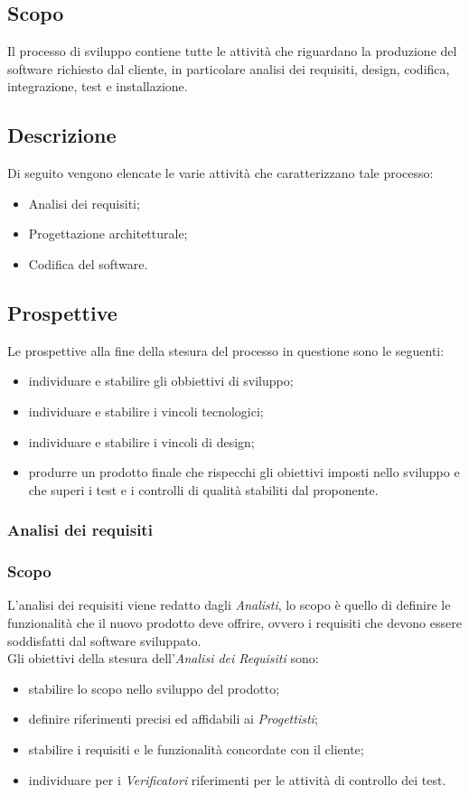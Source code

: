 \subsection{Scopo}\label{2.2.1}
Il processo di sviluppo contiene tutte le attività che riguardano la produzione del software richiesto dal cliente, in particolare analisi dei requisiti, design, codifica, integrazione, test e installazione.
\subsection{Descrizione}\label{2.2.2}
Di seguito vengono elencate le varie attività che caratterizzano tale processo:
\begin{itemize}
	\item Analisi dei requisiti;
	\item Progettazione architetturale;
	\item Codifica del software.
\end{itemize}
\subsection{Prospettive}\label{2.2.3}
Le prospettive alla fine della stesura del processo in questione sono le seguenti:
\begin{itemize}
	\item individuare e stabilire gli obbiettivi di sviluppo;
	\item individuare e stabilire i vincoli tecnologici;
	\item individuare e stabilire i vincoli di design;
	\item produrre un prodotto finale che rispecchi gli obiettivi imposti nello sviluppo e che superi i test e i controlli di qualità stabiliti dal proponente.
\end{itemize}
\subsubsection{Analisi dei requisiti}\label{2.2.3.1}
\subsubsection{Scopo}\label{2.2.3.1.1}
L'analisi dei requisiti viene redatto dagli \textit{Analisti}, lo scopo è quello di definire le funzionalità che il nuovo prodotto deve offrire, ovvero i requisiti che devono essere soddisfatti dal software sviluppato.\\
Gli obiettivi della stesura dell'\textit{Analisi dei Requisiti} sono:
\begin{itemize}
	\item stabilire lo scopo nello sviluppo del prodotto;
	\item definire riferimenti precisi ed affidabili ai \textit{Progettisti};
	\item stabilire i requisiti e le funzionalità concordate con il cliente;
	\item individuare per i \textit{Verificatori} riferimenti per le attività di controllo dei test.
\end{itemize}
